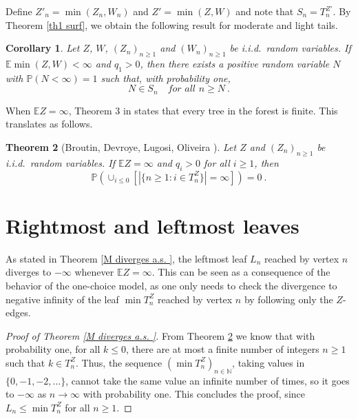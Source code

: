 \documentclass[12pt]{article}
\newcommand{\N}{\mathbb{N}}
\newcommand{\E}{\mathbb{E}}
\newtheorem{theorem}{Theorem}
\newtheorem{corollary}[theorem]{Corollary}
\numberwithin{equation}{section} \font\titre=cmbx12
\newcommand{\PP}{\mathbb{P}}
\newcommand{\prob}[1]{\mathbb{P}\left( #1 \right)}
\newcommand{\leftmost}{L}
\begin{document}
Define $Z'_n = \min(Z_n, W_n)$ and $Z' = \min (Z,W)$ and note that $S_n = T_n^{Z'}$. By Theorem \ref{th1 surf}, we obtain the following result for moderate and light tails.

\begin{corollary}\label{corollary surf}
    Let $Z$, $W$, $(Z_n)_{n\ge 1}$ and $(W_n)_{n\ge 1}$ be i.i.d.\ random variables.
    If $\E \min (Z,W) < \infty$ and $q_1>0$, then there exists a
    positive random variable $N$ with $\prob{N<\infty}=1$ such that,
    with probability one,
 $$N\in S_n \quad \textit{for all } n\ge N~.$$
\end{corollary}

When $\E Z = \infty$, Theorem 3 in \cite{surf} states that every tree in the forest is finite. This translates as follows.

\begin{theorem}[Broutin, Devroye, Lugosi, Oliveira \cite{surf}]\label{th2 surf}
    Let $Z$ and $(Z_n)_{n\ge 1}$ be i.i.d.\ random variables.
    If $\E Z = \infty$ and $q_i > 0$ for all $i \ge 1$, then 
    $$\PP( \cup_{ i \le 0} \left[ \left|\{n\ge 1 : i\in T_n^Z\}\right|=\infty \right] )=0~.$$
\end{theorem}

\section{Rightmost and leftmost leaves}
\label{sec:rlleaves}
  
As stated in Theorem \ref{M diverges a.s. }, the leftmost leaf $\leftmost_n$ reached by vertex $n$ diverges to $-\infty$ whenever $\E Z = \infty$. This can be seen as a consequence of the behavior of the one-choice model, as one only needs to check the divergence to negative infinity of the leaf $\min T_n^Z$ reached by vertex $n$ by following only the $Z$-edges.

\begin{proof}[Proof of Theorem \ref{M diverges a.s. }] From Theorem
  \ref{th2 surf} we know that with probability one, for all $k\le 0$,
  there are at most a finite number of integers $n\ge 1$ such that
  $k\in T_n^Z$. Thus, the sequence $(\min T_n^Z)_{n\in\N}$, taking
  values in $\{0,-1,-2,\dots\}$, cannot take the same value an
  infinite number of times, so it goes to $-\infty$ as $n\to \infty$
  with probability one. This concludes the proof, since $\leftmost_n\le \min T_n^Z$ for all $n\ge 1$.
    
\end{proof}
\end{document}
